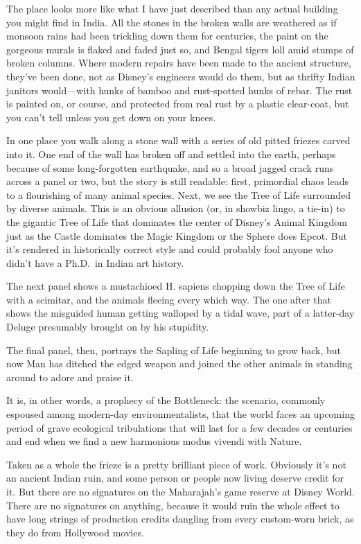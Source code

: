\documentclass[
  fontsize=11pt,
  paper=landscape,
  twocolumn=true,
  pagesize=pdftex,
  headings=small,
  DIV=15,
  ]{scrartcl}
\begin{document}
The place looks more like what I have just described than any actual
building you might find in India. All the stones in the broken walls are
weathered as if monsoon rains had been trickling down them for
centuries, the paint on the gorgeous murals is flaked and faded just so,
and Bengal tigers loll amid stumps of broken columns. Where modern
repairs have been made to the ancient structure, they've been done, not
as Disney's engineers would do them, but as thrifty Indian janitors
would---with hunks of bamboo and rust-spotted hunks of rebar. The rust
is painted on, or course, and protected from real rust by a plastic
clear-coat, but you can't tell unless you get down on your knees.

In one place you walk along a stone wall with a series of old pitted
friezes carved into it. One end of the wall has broken off and settled
into the earth, perhaps because of some long-forgotten earthquake, and
so a broad jagged crack runs across a panel or two, but the story is
still readable: first, primordial chaos leads to a flourishing of many
animal species. Next, we see the Tree of Life surrounded by diverse
animals. This is an obvious allusion (or, in showbiz lingo, a tie-in) to
the gigantic Tree of Life that dominates the center of Disney's Animal
Kingdom just as the Castle dominates the Magic Kingdom or the Sphere
does Epcot. But it's rendered in historically correct style and could
probably fool anyone who didn't have a Ph.D.~in Indian art history.

The next panel shows a mustachioed H. sapiens chopping down the Tree of
Life with a scimitar, and the animals fleeing every which way. The one
after that shows the misguided human getting walloped by a tidal wave,
part of a latter-day Deluge presumably brought on by his stupidity.

The final panel, then, portrays the Sapling of Life beginning to grow
back, but now Man has ditched the edged weapon and joined the other
animals in standing around to adore and praise it.

It is, in other words, a prophecy of the Bottleneck: the scenario,
commonly espoused among modern-day environmentalists, that the world
faces an upcoming period of grave ecological tribulations that will last
for a few decades or centuries and end when we find a new harmonious
modus vivendi with Nature.

Taken as a whole the frieze is a pretty brilliant piece of work.
Obviously it's not an ancient Indian ruin, and some person or people now
living deserve credit for it. But there are no signatures on the
Maharajah's game reserve at Disney World. There are no signatures on
anything, because it would ruin the whole effect to have long strings of
production credits dangling from every custom-worn brick, as they do
from Hollywood movies.
\end{document}
